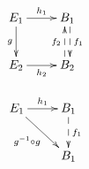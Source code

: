 \documentclass{beamer}
\begin{document}
\begin{frame}
    \begin{table}
        \begin{minipage}{.5\linewidth}
          \centering
            \begin{equation*}
                \xymatrix{
                {E_1}
                \ar[r]^{h_1}
                \ar@{->}[d]_{g}
                &
                {B_1}
                \ar@<0.5ex>@{-->}[d]^{f_1}
                \\
                {E_2}
                \ar[r]_{h_2}
                &
                {B_2}   
                \ar@<0.5ex>@{-->}[u]^{f_2}
                }
            \end{equation*}
        \end{minipage}
        \begin{minipage}{.5\linewidth}
          \centering
            \begin{equation*}
                \xymatrix{
                  {E_1}
                  \ar[r]^{h_1}
                  \ar@{->}[dr]_{g^{-1} \circ g}
                  &
                  {B_1}
                  \ar@{-->}[d]^{f_1}
                  \\
                  &
                  {B_1}      
                }
            \end{equation*}
        \end{minipage} 
    \end{table}
\end{frame}

  
\end{document}
